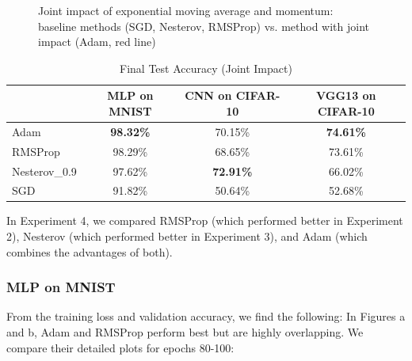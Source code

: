 \documentclass[12pt]{article}
\begin{document}
\begin{figure}[htbp]
    \caption{Joint impact of exponential moving average and momentum: baseline methods (SGD, Nesterov, RMSProp) vs. method with joint impact (Adam, red line)}
    \label{fig:joint_impact_study}
\end{figure}

\begin{table}[H]
\centering
\caption{Final Test Accuracy (Joint Impact)}
\label{tab:joint_impact}
\begin{tabular}{|l|c|c|c|}
\hline
             & MLP on MNIST & CNN on CIFAR-10 & VGG13 on CIFAR-10 \\ \hline
Adam         & \textbf{98.32\%} & 70.15\%         & \textbf{74.61\%}    \\ \hline
RMSProp      & 98.29\%      & 68.65\%         & 73.61\%           \\ \hline
Nesterov\_0.9 & 97.62\%      & \textbf{72.91\%}  & 66.02\%           \\ \hline
SGD          & 91.82\%      & 50.64\%         & 52.68\%           \\ \hline
\end{tabular}
\end{table}

In Experiment 4, we compared RMSProp (which performed better in Experiment 2), Nesterov (which performed better in Experiment 3), and Adam (which combines the advantages of both).

\subsubsection{MLP on MNIST}

From the training loss and validation accuracy, we find the following:
In Figures a and b, Adam and RMSProp perform best but are highly overlapping. We compare their detailed plots for epochs 80-100:
\end{document}
